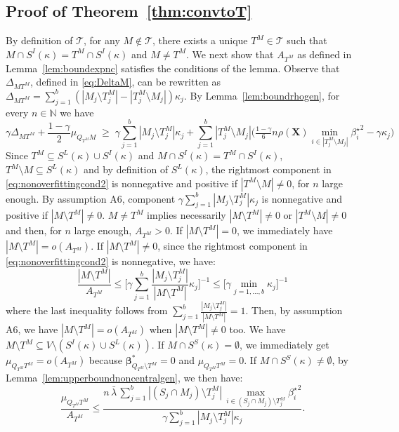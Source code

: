 \documentclass[aos]{imsart}
\theoremstyle{plain}
\newcommand{\N}{\mathbb{N}}
\newcommand{\T}{\mathcal{T}}
\newcommand{\bs}{\boldsymbol}
\begin{document}
\subsection{Proof of Theorem~\ref{thm:convtoT}}
By definition of $\T$, for any $M \not\in\T$, there exists a unique $T^M\in\T$ such that $M\cap S^{I}(\kappa)=T^M\cap S^{I}(\kappa)$ and $M\neq T^M$. We next show that $A_{T^M}$ as defined in Lemma~\ref{lem:boundexpnc} satisfies the conditions of the lemma. Observe that $\Delta_{MT^M}$, defined in \eqref{eq:DeltaM}, can be rewritten as $\Delta_{MT^M}=\sum_{j=1}^b(|M_j\setminus T^M_j|-|T^M_j\setminus M_j|)\kappa_j$. By  Lemma~\ref{lem:boundrhogen}, for every $n\in \N$ we have 
\begin{equation}\label{eq:nonoverfittingcond2}
   \gamma \Delta_{MT^M}+\frac{1-\gamma}{2}\mu_{Q_{T^M}M}\;\geq\; \gamma\sum_{j=1}^b|M_j \setminus T^M_j|\kappa_j + \sum_{j=1}^b |T^M_j\setminus M_j |\Big(\tfrac{1-\gamma}{6} n \rho(\bs X) \min_{i\in |T^M_j\setminus M_j|}{\beta^{\star}_i}^{2} - \gamma\kappa_j\Big) 
\end{equation} 
Since $T^M \subseteq S^L(\kappa) \cup S^{I}(\kappa)$ and $M\cap S^{I}(\kappa)=T^M\cap S^{I}(\kappa)$, $T^M\setminus M \subseteq S^L(\kappa)$ and by definition of $S^L(\kappa)$, the rightmost component in \eqref{eq:nonoverfittingcond2} is nonnegative and positive if $|T^M\setminus M|\neq0$, for $n$ large enough. By assumption A6, component $\gamma\sum_{j=1}^b|M_j \setminus T^M_j|\kappa_j$ is nonnegative and positive if $|M\setminus T^M|\neq0$.  $M\neq T^M$ implies necessarily $|M\setminus T^M|\neq0$ or $|T^M\setminus M|\neq0$ and then, for $n$ large enough, $A_{T^M}>0$. If $|M\setminus T^M|=0$, we immediately have $|M\setminus T^M|=o(A_{T^M})$. If $|M\setminus T^M|\neq 0$, since the rightmost component in \eqref{eq:nonoverfittingcond2} is nonnegative, we have:
$$\frac{|M\setminus T^M|}{A_{T^M}}\leq \bigg[ \gamma\sum_{j=1}^b\frac{|M_j \setminus T^M_j|}{|M\setminus T^M|}\kappa_j \bigg]^{-1} \leq \bigg[ \gamma\min_{j=1,\ldots,b}\kappa_j \bigg]^{-1} $$
where the last inequality follows from $\sum_{j=1}^b\frac{|M_j \setminus T^M_j|}{|M\setminus T^M|}=1$. Then, by assumption A6, we have $|M\setminus T^M|=o(A_{T^M})$ when $|M\setminus T^M|\neq 0$ too. 
We have $M\setminus T^M\subseteq V\setminus (S^{I}(\kappa) \cup S^L(\kappa))$. If $M\cap S^{S}(\kappa)=\emptyset$, we immediately get $\mu_{Q_{T^M} T^M}=o(A_{T^M})$ because $\bs\beta^*_{Q_{T^M} \setminus T^M}=0$ and $\mu_{Q_{T^M} T^M}=0$. If $M\cap S^{S}(\kappa)\neq\emptyset$, by Lemma~\ref{lem:upperboundnoncentralgen}, we then have:
$$\frac{\mu_{Q_{T^M} T^M}}{ A_{T^M}} \leq \frac{n\,\bar{\lambda}\,\sum_{j=1}^b|(S_j\cap M_j )\setminus T^M_j|\,\max_{i\in (S_j\cap M_j )\setminus T^M_j}{\beta_{i}^{\star}}^2}{ \gamma\sum_{j=1}^b|M_j \setminus T^M_j|\kappa_j}.$$
\end{document}
